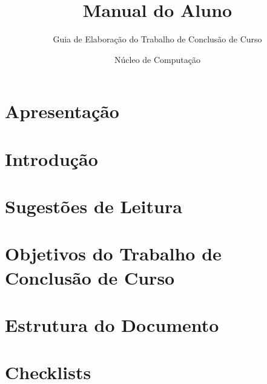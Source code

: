 \documentclass[a4paper,12pt]{scrartcl}
\begin{document}
\title{Manual do Aluno}
\subtitle{Guia de Elaboração do Trabalho de Conclusão de Curso}
\author{Núcleo de Computação\\ }


\maketitle

\section*{Apresentação}


\section{Introdução}

\section{Sugestões de Leitura}


\section{Objetivos do Trabalho de Conclusão de Curso}


\section{Estrutura do Documento}


\section{Checklists}







\end{document}
